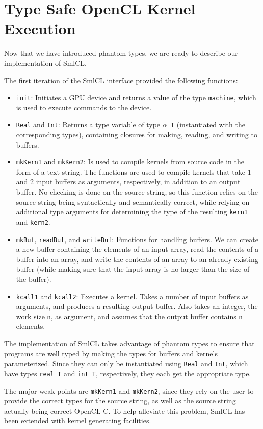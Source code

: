 \section{Type Safe OpenCL Kernel Execution}

Now that we have introduced phantom types, we are ready to describe
our implementation of SmlCL.

The first iteration of the SmlCL interface provided the
following functions:

\begin{itemize}
  \item \texttt{init}: Initiates a GPU device and returns a value of
    the type \texttt{machine}, which is used to execute commands to
    the device.
  \item \texttt{Real} and \texttt{Int}: Returns a type variable of
    type \texttt{$\alpha$ T} (instantiated with the corresponding
    types), containing closures for making, reading, and writing to
    buffers.
  \item \texttt{mkKern1} and \texttt{mkKern2}: Is used to compile
    kernels from source code in the form of a text string. The
    functions are used to compile kernels that take 1 and 2 input
    buffers as arguments, respectively, in addition to an output
    buffer. No checking is done on the source string, so this function
    relies on the source string being syntactically and semantically
    correct, while relying on additional type arguments for
    determining the type of the resulting \texttt{kern1} and
    \texttt{kern2}.
  \item \texttt{mkBuf}, \texttt{readBuf}, and \texttt{writeBuf}:
    Functions for handling buffers. We can create a new buffer
    containing the elements of an input array, read the contents of a
    buffer into an array, and write the contents of an array to an
    already existing buffer (while making sure that the input array is
    no larger than the size of the buffer).
  \item \texttt{kcall1} and \texttt{kcall2}: Executes a kernel. Takes
    a number of input buffers as arguments, and produces a resulting
    output buffer. Also takes an integer, the work size \texttt{n}, as
    argument, and assumes that the output buffer contains \texttt{n}
    elements.
\end{itemize}

The implementation of SmlCL takes advantage of phantom types to
ensure that programs are well typed by making the types for buffers
and kernels parameterized. Since they can only be instantiated using
\texttt{Real} and \texttt{Int}, which have types \texttt{real T} and
\texttt{int T}, respectively, they each get the appropriate type.

The major weak points are \texttt{mkKern1} and \texttt{mkKern2}, since
they rely on the user to provide the correct types for the source
string, as well as the source string actually being correct OpenCL C.
To help alleviate this problem, SmlCL has been extended with kernel
generating facilities.
